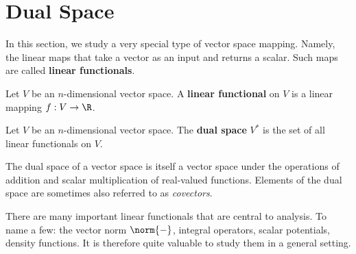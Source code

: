 \section{Dual Space}
In this section, we study a very special type of vector space mapping. Namely, the linear maps that take a vector as an input and returns a scalar. Such maps are called \textbf{linear functionals}.
\begin{definition}
  Let \( V \) be an \( n \)-dimensional vector space. A \textbf{linear functional} on \( V \) is a linear mapping \( f:V\to\R \).
\end{definition}

\begin{definition}
  Let \( V \) be an \( n \)-dimensional vector space. The \textbf{dual space} \( V^* \) is the set of all linear functionals on \( V \).
\end{definition}

The dual space of a vector space is itself a vector space under the operations of addition and scalar multiplication of real-valued functions. Elements of the dual space are sometimes also referred to as \emph{covectors}.

\vspace{3mm}

There are many important linear functionals that are central to analysis. To name a few: the vector norm \( \norm{-} \), integral operators, scalar potentials, density functions. It is therefore quite valuable to study them in a general setting.

\vspace{3mm}

